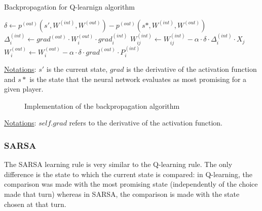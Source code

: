 \documentclass{article}
\begin{document}
\begin{algorithm}[H]
	\caption{Backpropagation for Q-learnign algorithm}
	\label{alg:backprop}
	\begin{algorithmic}[1]
	    \State $\delta \leftarrow p^{(out)}(s',W^{(int)},W^{(out)})-p^{(out)}(s*,W^{(int)},W^{(out)}) $
		    \State $\Delta_{i}^{(int)} \leftarrow grad^{(out)} \cdot W_{i}^{(out)} \cdot grad_{i}^{(int)}$
    		    \State $ W_{ij}^{(int)} \leftarrow W_{ij}^{(int)} - \alpha \cdot \delta \cdot \Delta_{i}^{(int)} \cdot X_{j} $
	    	\EndFor
	    	\State $ W_{i}^{(out)} \leftarrow W_{i}^{(out)} - \alpha \cdot \delta \cdot grad^{(out)} \cdot P_{i}^{(int)} $
	    \EndFor
	\end{algorithmic}
\end{algorithm}

\underline{Notations}: $s'$ is the current state, $grad$ is the derivative of the activation function and $s*$ is the state that the neural network evaluates as most promising for a given player.

\begin{figure}[H]
    \begin{center}
      \label{code:bp-code}
      \caption{Implementation of the backpropagation algorithm}
    \end{center}
\end{figure}

\underline{Notations}: $self.grad$ refers to the derivative of the activation function.

\subsubsection{SARSA}

The SARSA learning rule is very similar to the Q-learning rule. The only difference is the state to which the current state is compared: in Q-learning, the comparison was made with the most promising state (independently of the choice made that turn) whereas in SARSA, the comparison is made with the state chosen at that turn.
\end{document}
